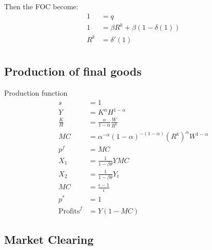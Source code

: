 \documentclass[11pt]{article}
\begin{document}
Then the FOC become:
\begin{align*}
	1 &= q \\
	1 &= \beta   R^k  + \beta(1-\delta(1))    \\
	 R^k &=\delta'(1) \\
\end{align*}


\subsection{Production of final goods}

Production function
\begin{align*}
	s &= 1 \\
	Y &= K^{\alpha} H^{1-\alpha} \\
	\frac{K}{H} &= \frac{\alpha}{1-\alpha}\frac{W}{R^k} \\
	MC &=\alpha^{-\alpha} (1-\alpha)^{-(1-\alpha)} (R^k)^{\alpha}W^{1-\alpha} \\
	p^f &=MC \\
	X_{1} & = \frac{1}{1-\beta\theta} Y MC  \\ 
	X_{2} & =\frac{1}{1-\beta\theta}  Y_{t}  \\ 
	MC &=  \frac{\epsilon-1}{\epsilon} \\
	p^* &= 1 \\
	\text{Profits}^f &= Y(1-MC)
\end{align*}





\subsection{Market Clearing}
%
\end{document}
